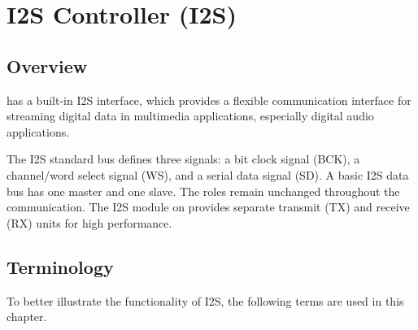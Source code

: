 \documentclass[main\_\_EN.tex]{subfiles}
\begin{document}

\ifglobal
\else
    {\let\clearpage\relax \listoftodos}
    {\let\clearpage\relax \listofdonetodos}
    \tableofcontents
    \listoftables
    \listoffigures
\fi



\hypertarget{i2s}{}
\chapter{I2S Controller (I2S)}
\label{mod:i2s}


\section{Overview}
\chipname{} has a built-in I2S interface, which provides a flexible communication interface for streaming digital data in multimedia applications, especially digital audio applications.

The I2S standard bus defines three signals: a bit clock signal (BCK), a channel/word select signal (WS), and a serial data signal (SD). A basic I2S data bus has one master and one slave. The roles remain unchanged throughout the communication. The I2S module on \chipname{} provides separate transmit (TX) and receive (RX) units for high performance.

\section{Terminology}

To better illustrate the functionality of I2S, the following terms are used in this chapter. 
\end{document}
